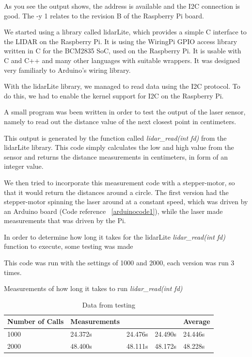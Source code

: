 As you see the output shows, the address is available and the I2C connection is good. The -y 1 relates to the revision B of the Raspberry Pi board.

We started using a library called lidarLite, which provides a simple C interface to the LIDAR on the Raspberry Pi. It is using the WiringPi GPIO access library written in C for the BCM2835 SoC, used on the Raspberry Pi. It is usable with C and C++ and many other languages with suitable wrappers. It was designed very familiarly to Arduino's wiring library.

With the lidarLite library\cite{lidarlib}, we managed to read data using the I2C protocol. To do this, we had to enable the kernel support for I2C on the Raspberry Pi\cite{i2csetup}.

A small program was been written in order to test the output of the laser sensor, namely to read out the distance value of the next closest point in centimeters. 


This output is generated by the function called \textit{lidar\_read(int fd)} from the lidarLite library. This code simply calculates the low and high value from the sensor and returns the distance measurements in centimeters, in form of an integer value.


We then tried to incorporate this measurement code with a stepper-motor, so that it would return the distances around a circle. The first version had the stepper-motor spinning the laser around at a constant speed, which was driven by an Arduino board (Code reference ~\ref{arduinocode1}), while the laser made measurements that was driven by the Pi.

In order to determine how long it takes for the lidarLite \textit{lidar\_read(int fd)} function to execute, some testing was made


This code was run with the settings of 1000 and 2000, each version was run 3 times.

Measurements of how long it takes to run \textit{lidar\_read(int fd)}

\begin{table}[H]
	\centering
	\begin{tabular}{|l|l|l|l|l|} \hline
            Number of Calls & Measurements & & & Average \\ \hline
            1000 & 24.372s & 24.476s & 24.490s & 24.446s \\ \hline
            2000 & 48.400s & 48.111s & 48.172s & 48.228s \\ \hline
	\end{tabular}
	\caption{Data from testing}
\end{table}

